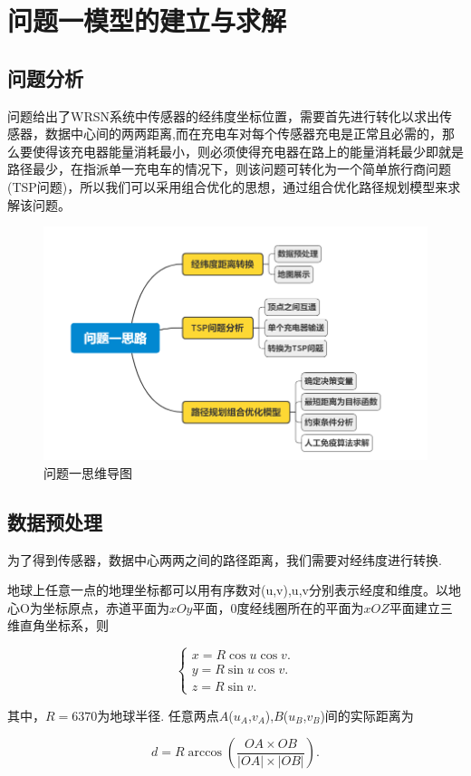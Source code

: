 \documentclass{whutmod}
\newcommand{\upcite}[1]{\textsuperscript{\textsuperscript{\cite{#1}}}}
\begin{document}
\section{问题一模型的建立与求解}
\subsection{问题分析}
问题给出了WRSN系统中传感器的经纬度坐标位置，需要首先进行转化以求出传感器，数据中心间的两两距离,而在充电车对每个传感器充电是正常且必需的，那么要使得该充电器能量消耗最小，则必须使得充电器在路上的能量消耗最少即就是路径最少，在指派单一充电车的情况下，则该问题可转化为一个简单旅行商问题(TSP问题)，所以我们可以采用组合优化的思想，通过组合优化路径规划模型来求解该问题。
\begin{figure}[!htbp]
	\centering
	\includegraphics[width=.6\textwidth]{figures/mindmap1.png}
	\caption{问题一思维导图}
\end{figure} 

\subsection{数据预处理}
为了得到传感器，数据中心两两之间的路径距离，我们需要对经纬度进行转换.

地球上任意一点的地理坐标都可以用有序数对(u,v),u,v分别表示经度和维度。以地心O为坐标原点，赤道平面为$xOy$平面，0度经线圈所在的平面为$xOZ$平面建立三维直角坐标系，则

\begin{equation}\left\{\begin{array}{l}
		x=R \cos u \cos v .\\
		y=R \sin u \cos v .\\
		z=R \sin v.
	\end{array}\right.
\end{equation}

其中，$R=6370$为地球半径.
任意两点$A$($u_{A}$,$v_{A}$),$B$($u_{B}$,$v_{B}$)间的实际距离为

\begin{equation}
	d=R \arccos( \frac{OA\times OB}{|OA|\times |OB|}).
\end{equation}
\end{document}
